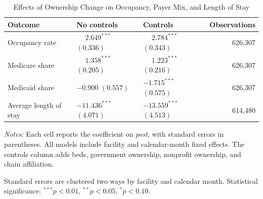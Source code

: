\documentclass[12pt]{article}
\begin{document}

\begin{table}[H]
\centering
\begin{threeparttable}
\caption{Effects of Ownership Change on Occupancy, Payer Mix, and Length of Stay}
\label{tab:composition-checks-monthly}
\small
\setlength{\tabcolsep}{6pt}
\begin{tabularx}{\textwidth}{@{} l Y Y r @{}}
\toprule
Outcome & No controls & Controls & Observations \\
\midrule
Occupancy rate &  &  & 626,307 \\
Medicare share &  &  & 626,307 \\
Medicaid share &  &  & 626,307 \\
Average length of stay &  &  & 614,480 \\
\bottomrule
\end{tabularx}

\begin{tablenotes}[flushleft]
\footnotesize
\item \textit{Notes:} Each cell reports the coefficient on \textit{post}, with standard errors in parentheses. All models include facility and calendar-month fixed effects. The controls column adds beds, government ownership, nonprofit ownership, and chain affiliation.
\item Standard errors are clustered two ways by facility and calendar month. Statistical significance: $^{***}p<0.01$, $^{**}p<0.05$, $^{*}p<0.10$.
\end{tablenotes}
\end{threeparttable}
\end{table}
\end{document}
